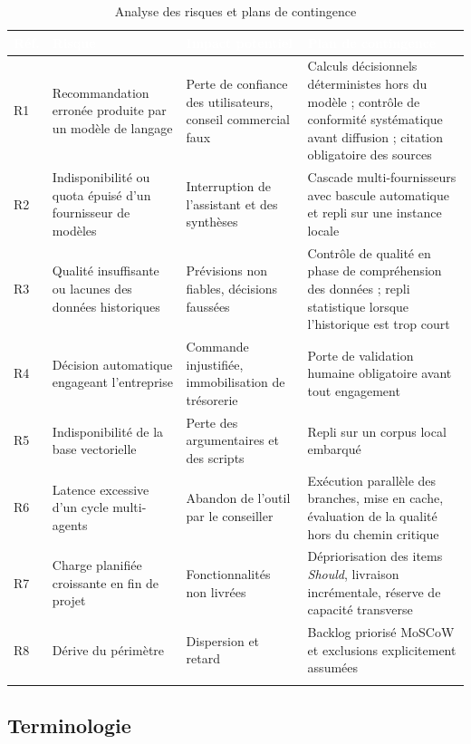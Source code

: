\begin{longtable}{|P{0.9cm}|P{3.4cm}|P{4.4cm}|P{4.8cm}|}
\hline
{}
\textcolor{white}{\textbf{Réf.}} &
\textcolor{white}{\textbf{Risque}} &
\textcolor{white}{\textbf{Impact potentiel}} &
\textcolor{white}{\textbf{Plan de contingence}} \\
\hline
\endhead
\hline
\endfoot
\hline
\endlastfoot
R1 & Recommandation erronée produite par un modèle de langage \cite{ji2023hallucination} & Perte de confiance des utilisateurs, conseil commercial faux & Calculs décisionnels déterministes hors du modèle ; contrôle de conformité systématique avant diffusion ; citation obligatoire des sources \\
\hline
R2 & Indisponibilité ou quota épuisé d'un fournisseur de modèles & Interruption de l'assistant et des synthèses & Cascade multi-fournisseurs avec bascule automatique et repli sur une instance locale \\
\hline
R3 & Qualité insuffisante ou lacunes des données historiques & Prévisions non fiables, décisions faussées & Contrôle de qualité en phase de compréhension des données ; repli statistique lorsque l'historique est trop court \\
\hline
R4 & Décision automatique engageant l'entreprise & Commande injustifiée, immobilisation de trésorerie & Porte de validation humaine obligatoire avant tout engagement \cite{amershi2019guidelines} \\
\hline
R5 & Indisponibilité de la base vectorielle & Perte des argumentaires et des scripts & Repli sur un corpus local embarqué \\
\hline
R6 & Latence excessive d'un cycle multi-agents & Abandon de l'outil par le conseiller & Exécution parallèle des branches, mise en cache, évaluation de la qualité hors du chemin critique \\
\hline
R7 & Charge planifiée croissante en fin de projet & Fonctionnalités non livrées & Dépriorisation des items \textit{Should}, livraison incrémentale, réserve de capacité transverse \\
\hline
R8 & Dérive du périmètre & Dispersion et retard & Backlog priorisé MoSCoW et exclusions explicitement assumées \\
\hline
\caption{Analyse des risques et plans de contingence}
\label{tab:risques-chap2}
\end{longtable}

\subsection{Terminologie}

